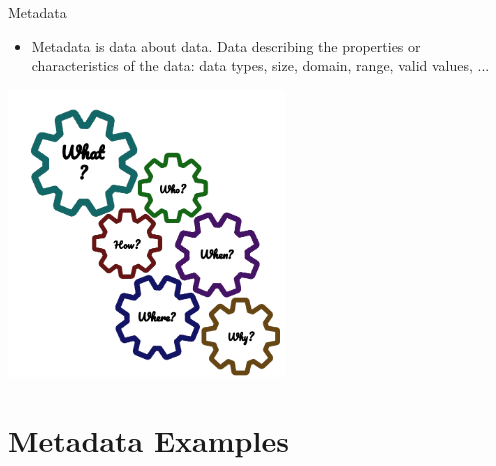 \documentclass{beamer}
\begin{document}
\begin{frame}{Metadata}
    \begin{itemize}
        \item Metadata is data about data.  Data describing the properties or characteristics of the data: data types, size, domain, range, valid values, ...
    \end{itemize}
    \centering
    \includegraphics[width=0.55\textwidth]{figures/metadata3}
\end{frame}

\section{Metadata Examples}
\end{document}
